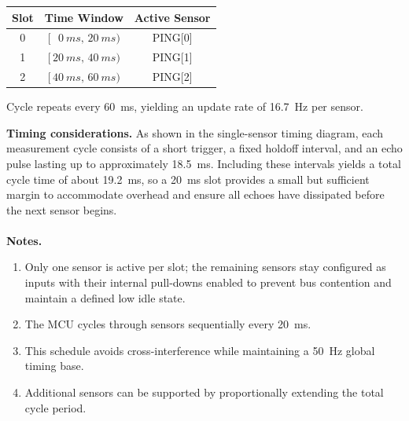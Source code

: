 \documentclass[12pt]{article}
\begin{document}
\vspace{6pt}
\begin{center}
\renewcommand{\arraystretch}{1.15}
\begin{tabular}{ccc} %
\toprule
\textbf{Slot} & \textbf{Time Window} & \textbf{Active Sensor} \\
\midrule
0 & $[\,\,\,\,\SI{0}{ms},\,\SI{20}{ms})$   & PING[0] \\
1 & $[\,\SI{20}{ms},\,\SI{40}{ms})$  & PING[1] \\
2 & $[\,\SI{40}{ms},\,\SI{60}{ms})$  & PING[2] \\
\bottomrule
\end{tabular}

\vspace{3pt}
\footnotesize
Cycle repeats every \SI{60}{ms}, yielding an update rate of \SI{16.7}{Hz} per sensor.
\end{center}
\vspace{6pt}
\noindent\textbf{Timing considerations.}
As shown in the single-sensor timing diagram, each measurement cycle consists of a short trigger, a fixed holdoff interval, and an echo pulse lasting up to approximately \SI{18.5}{ms}. Including these intervals yields a total cycle time of about \SI{19.2}{ms}, so a \SI{20}{ms} slot provides a small but sufficient margin to accommodate overhead and ensure all echoes have dissipated before the next sensor begins.\\
\\
\noindent\textbf{Notes.}
\begin{enumerate}
  \item Only one sensor is active per slot; the remaining sensors stay configured as inputs with their internal pull-downs enabled to prevent bus contention and maintain a defined low idle state. 
  \item The MCU cycles through sensors sequentially every \SI{20}{ms}.
  \item This schedule avoids cross-interference while maintaining a \SI{50}{Hz} global timing base.
  \item Additional sensors can be supported by proportionally extending the total cycle period.
\end{enumerate}
\end{document}
